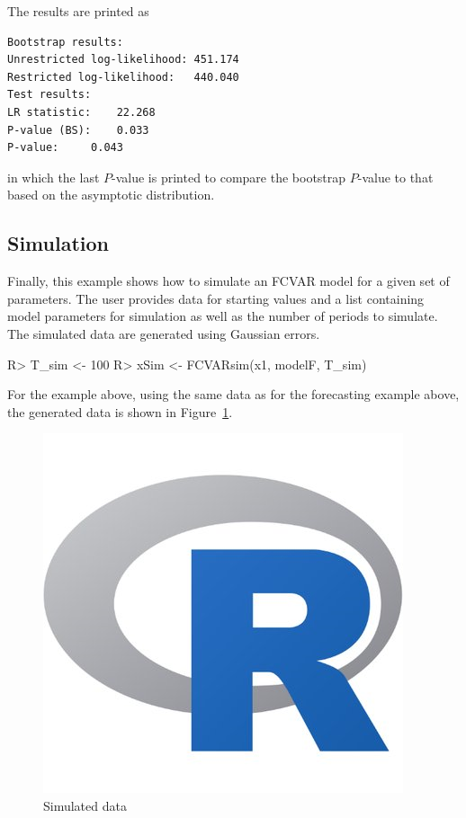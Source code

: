 \documentclass[article]{jss}
\begin{document}
The results are printed as
\begin{verbatim}
Bootstrap results:
Unrestricted log-likelihood: 451.174
Restricted log-likelihood:   440.040
Test results:
LR statistic: 	 22.268
P-value (BS): 	 0.033
P-value: 	 0.043
\end{verbatim}
in which the last $P$-value is printed to compare the bootstrap $P$-value to that based on the asymptotic distribution. 

\subsection{Simulation}
\label{sec:simulation}

Finally, 
this example
shows how to simulate an FCVAR model for a given set of parameters. The user provides data for starting values and a list containing model parameters for simulation as well as the number of periods to simulate. The simulated data are generated using Gaussian errors.

\begin{Code}
R> T_sim <- 100
R> xSim <- FCVARsim(x1, modelF, T_sim)
\end{Code}

For the example above, 
using the same data as for the forecasting example above, 
the generated data is shown in Figure~\ref{fig:sim}.

\begin{figure}[tbh]
  \centering
  \caption{Simulated data}
  \label{fig:sim}
  \includegraphics[scale = 1, keepaspectratio=true]{Figures/sim.png}
\end{figure}
\end{document}
